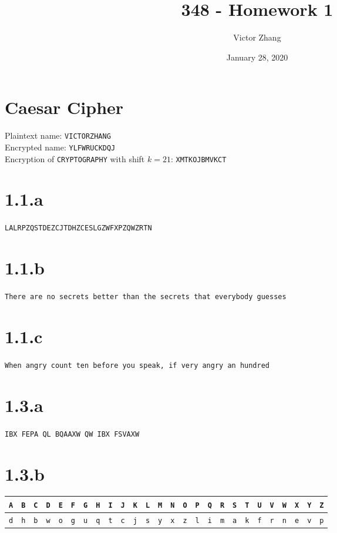 \documentclass{article}
\title{348 - Homework 1}
\author{Victor Zhang}
\date{January 28, 2020}
\begin{document}
\maketitle

\section*{Caesar Cipher}
Plaintext name: \verb|VICTORZHANG|\\
Encrypted name: \verb|YLFWRUCKDQJ|\\
Encryption of \verb|CRYPTOGRAPHY| with shift $k = 21$: \verb|XMTKOJBMVKCT|

\section*{1.1.a}
\verb|LALRPZQSTDEZCJTDHZCESLGZWFXPZQWZRTN|
\section*{1.1.b}
\verb|There are no secrets better than the secrets that everybody guesses|
\section*{1.1.c}
\verb|When angry count ten before you speak, if very angry an hundred|

\section*{1.3.a}
\verb|IBX FEPA QL BQAAXW QW IBX FSVAXW|
\section*{1.3.b}
\begin{tabular}{|c|c|c|c|c|c|c|c|c|c|c|c|c|c|c|c|c|c|c|c|c|c|c|c|c|c|}
\hline
\verb|A| & \verb|B| & \verb|C| & \verb|D| & \verb|E| & \verb|F| & \verb|G| & \verb|H| & \verb|I| & \verb|J| & \verb|K| & \verb|L| & \verb|M| & \verb|N| & \verb|O| & \verb|P| & \verb|Q| & \verb|R| & \verb|S| & \verb|T| & \verb|U| & \verb|V| & \verb|W| & \verb|X| & \verb|Y| & \verb|Z|\\
\hline
\verb|d| & \verb|h| & \verb|b| & \verb|w| & \verb|o| & \verb|g| & \verb|u| & \verb|q| & \verb|t| & \verb|c| & \verb|j| & \verb|s| & \verb|y| & \verb|x| & \verb|z| & \verb|l| & \verb|i| & \verb|m| & \verb|a| & \verb|k| & \verb|f| & \verb|r| & \verb|n| & \verb|e| & \verb|v| & \verb|p|\\
\hline
\end{tabular}
\end{document}
